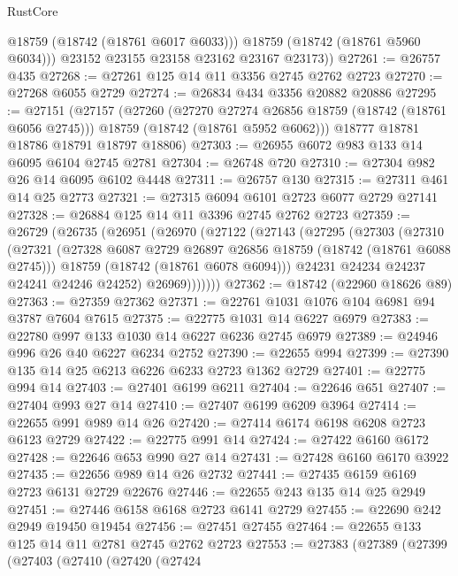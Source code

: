\begin{lexlean}{RustCore}
\begin{coremodule}
            @18759
            (@18742 (@18761 @6017 @6033)))
          @18759
          (@18742 (@18761 @5960 @6034)))
        @23152
        @23155
        @23158
        @23162
        @23167
        @23173))
@27261 := @26757 @435
@27268 := @27261 @125 @14 @11 @3356 @2745 @2762 @2723
@27270 := @27268 @6055 @2729
@27274 := @26834 @434 @3356 @20882 @20886
@27295 := @27151
    (@27157
      (@27260
        (@27270 @27274 @26856 @18759 (@18742 (@18761 @6056 @2745)))
        @18759
        (@18742 (@18761 @5952 @6062)))
      @18777
      @18781
      @18786
      @18791
      @18797
      @18806)
@27303 := @26955 @6072 @983 @133 @14 @6095 @6104 @2745 @2781
@27304 := @26748 @720
@27310 := @27304 @982 @26 @14 @6095 @6102 @4448
@27311 := @26757 @130
@27315 := @27311 @461 @14 @25 @2773
@27321 := @27315 @6094 @6101 @2723 @6077 @2729 @27141
@27328 := @26884 @125 @14 @11 @3396 @2745 @2762 @2723
@27359 := @26729
    (@26735
      (@26951
        (@26970
          (@27122
            (@27143
              (@27295
                (@27303
                  (@27310
                    (@27321
                      (@27328 @6087 @2729 @26897 @26856 @18759 (@18742 (@18761 @6088 @2745)))
                      @18759
                      (@18742 (@18761 @6078 @6094)))
                    @24231
                    @24234
                    @24237
                    @24241
                    @24246
                    @24252)
                  @26969)))))))
@27362 := @18742 (@22960 @18626 @89)
@27363 := @27359 @27362
@27371 := @22761 @1031 @1076 @104 @6981 @94 @3787 @7604 @7615
@27375 := @22775 @1031 @14 @6227 @6979
@27383 := @22780 @997 @133 @1030 @14 @6227 @6236 @2745 @6979
@27389 := @24946 @996 @26 @40 @6227 @6234 @2752
@27390 := @22655 @994
@27399 := @27390 @135 @14 @25 @6213 @6226 @6233 @2723 @1362 @2729
@27401 := @22775 @994 @14
@27403 := @27401 @6199 @6211
@27404 := @22646 @651
@27407 := @27404 @993 @27 @14
@27410 := @27407 @6199 @6209 @3964
@27414 := @22655 @991 @989 @14 @26
@27420 := @27414 @6174 @6198 @6208 @2723 @6123 @2729
@27422 := @22775 @991 @14
@27424 := @27422 @6160 @6172
@27428 := @22646 @653 @990 @27 @14
@27431 := @27428 @6160 @6170 @3922
@27435 := @22656 @989 @14 @26 @2732
@27441 := @27435 @6159 @6169 @2723 @6131 @2729 @22676
@27446 := @22655 @243 @135 @14 @25 @2949
@27451 := @27446 @6158 @6168 @2723 @6141 @2729
@27455 := @22690 @242 @2949 @19450 @19454
@27456 := @27451 @27455
@27464 := @22655 @133 @125 @14 @11 @2781 @2745 @2762 @2723
@27553 := @27383
    (@27389
      (@27399
        (@27403
          (@27410
            (@27420
              (@27424

\end{coremodule}
\end{lexlean}

